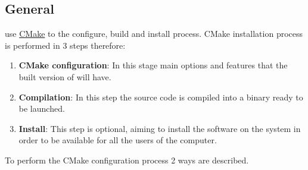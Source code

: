 \subsection{General}
%
\NAME use \href{http://www.cmake.org}{CMake} to the configure, build and 
install process. CMake installation process is performed in 3 steps therefore:
%
\begin{enumerate}
	\item \textbf{CMake configuration}: In this stage main options and features
	that the built version of \NAME will have.
	\item \textbf{Compilation}: In this step the source code is compiled into a
	binary ready to be launched.
	\item \textbf{Install}: This step is optional, aiming to install the 
	software on the system in order to be available for all the users of the 
	computer.
\end{enumerate}
%
To perform the CMake configuration process 2 ways are described.
%
